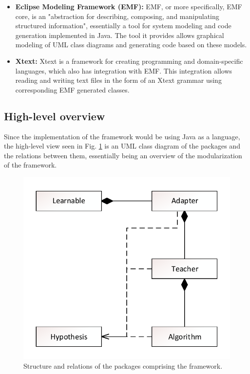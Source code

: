 \begin{itemize}
	\item \textbf{Eclipse Modeling Framework (EMF):} EMF, or more specifically, EMF core, is an "abstraction for describing, composing, and manipulating structured information", essentially a tool for system modeling and code generation implemented in Java. The tool it provides allows graphical modeling of UML class diagrams and generating code based on these models.
	\item \textbf{Xtext:} Xtext is a framework for creating programming and domain-specific languages, which also has integration with EMF. This integration allows reading and writing text files in the form of an Xtext grammar using corresponding EMF generated classes.
\end{itemize}


\subsection{High-level overview}

Since the implementation of the framework would be using Java as a language, the high-level view seen in Fig. \ref{fig:abstractoverview} is an UML class diagram of the packages and the relations between them, essentially being an overview of the modularization of the framework.

\begin{figure}
	\centering
	\includegraphics[width=0.5\linewidth]{figures/abstractoverview}
	\caption{Structure and relations of the packages comprising the framework.}
	\label{fig:abstractoverview}
\end{figure}

